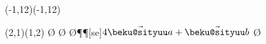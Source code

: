 \documentclass{jarticle}
\begin{document}
\begin{zahyou}[ul=8mm](-1,12)(-1,12)
  \zahyouMemori[g]%
  \def\E{(2,1)}%
  \def\F{(1,2)}%
  \begin{azahyou}[(1,0)]\E\F
    \azPut{}
    \azArrowLine\O\A\azPut{}
    \azArrowLine\O\B\azPut{}
    \azArrowLine\O\P\azPut\P[se]{$4\beku a+\beku b$}
    \azArrowLine\O\Q\azPut{}
  \end{azahyou}
\end{zahyou}
\end{document}
